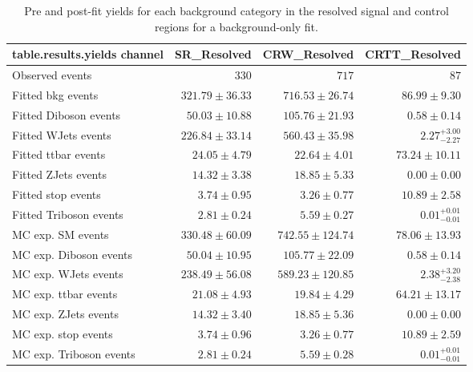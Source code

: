 \begin{table}
\centering
\small
\begin{tabular*}{\textwidth}{@{\extracolsep{\fill}}lrrr}
\toprule
\textbf{table.results.yields channel}           & SR\_Resolved            & CRW\_Resolved            & CRTT\_Resolved              \\
\midrule
Observed events          & $330$              & $717$              & $87$                    \\
\midrule
Fitted bkg events         & $321.79 \pm 36.33$          & $716.53 \pm 26.74$          & $86.99 \pm 9.30$              \\
\midrule
        Fitted Diboson events         & $50.03 \pm 10.88$          & $105.76 \pm 21.93$          & $0.58 \pm 0.14$              \\
        Fitted WJets events         & $226.84 \pm 33.14$          & $560.43 \pm 35.98$          & $2.27_{-2.27}^{+3.00}$              \\
        Fitted ttbar events         & $24.05 \pm 4.79$          & $22.64 \pm 4.01$          & $73.24 \pm 10.11$              \\
        Fitted ZJets events         & $14.32 \pm 3.38$          & $18.85 \pm 5.33$          & $0.00 \pm 0.00$              \\
        Fitted stop events         & $3.74 \pm 0.95$          & $3.26 \pm 0.77$          & $10.89 \pm 2.58$              \\
        Fitted Triboson events         & $2.81 \pm 0.24$          & $5.59 \pm 0.27$          & $0.01_{-0.01}^{+0.01}$              \\
 \midrule
MC exp. SM events              & $330.48 \pm 60.09$          & $742.55 \pm 124.74$          & $78.06 \pm 13.93$              \\
\midrule
        MC exp. Diboson events         & $50.04 \pm 10.95$          & $105.77 \pm 22.09$          & $0.58 \pm 0.14$              \\
        MC exp. WJets events         & $238.49 \pm 56.08$          & $589.23 \pm 120.85$          & $2.38_{-2.38}^{+3.20}$              \\
        MC exp. ttbar events         & $21.08 \pm 4.93$          & $19.84 \pm 4.29$          & $64.21 \pm 13.17$              \\
        MC exp. ZJets events         & $14.32 \pm 3.40$          & $18.85 \pm 5.36$          & $0.00 \pm 0.00$              \\
        MC exp. stop events         & $3.74 \pm 0.96$          & $3.26 \pm 0.77$          & $10.89 \pm 2.59$              \\
        MC exp. Triboson events         & $2.81 \pm 0.24$          & $5.59 \pm 0.28$          & $0.01_{-0.01}^{+0.01}$              \\
\bottomrule
\end{tabular*}
\caption{Pre and post-fit yields for each background category in the resolved signal and control regions for a background-only fit.}
\label{tab:yields_res}
\end{table}

